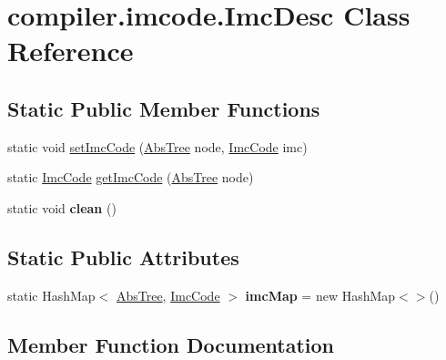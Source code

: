 \hypertarget{classcompiler_1_1imcode_1_1_imc_desc}{}\section{compiler.\+imcode.\+Imc\+Desc Class Reference}
\label{classcompiler_1_1imcode_1_1_imc_desc}
\subsection*{Static Public Member Functions}
\begin{DoxyCompactItemize}
\item 
static void \hyperlink{classcompiler_1_1imcode_1_1_imc_desc_a473fce2cdedd413a152653740dc4efc9}{set\+Imc\+Code} (\hyperlink{classcompiler_1_1abstr_1_1tree_1_1_abs_tree}{Abs\+Tree} node, \hyperlink{interfacecompiler_1_1imcode_1_1_imc_code}{Imc\+Code} imc)
\item 
static \hyperlink{interfacecompiler_1_1imcode_1_1_imc_code}{Imc\+Code} \hyperlink{classcompiler_1_1imcode_1_1_imc_desc_a94ffd7185f2339472d335c475f046a5e}{get\+Imc\+Code} (\hyperlink{classcompiler_1_1abstr_1_1tree_1_1_abs_tree}{Abs\+Tree} node)
\item 
\mbox{\label{classcompiler_1_1imcode_1_1_imc_desc_ac36ed670c3ef02e01402efe21bebcd7b}} 
static void {\bfseries clean} ()
\end{DoxyCompactItemize}
\subsection*{Static Public Attributes}
\begin{DoxyCompactItemize}
\item 
\mbox{\label{classcompiler_1_1imcode_1_1_imc_desc_a1e1f1f2816a9742fd839ce83d46b5de9}} 
static Hash\+Map$<$ \hyperlink{classcompiler_1_1abstr_1_1tree_1_1_abs_tree}{Abs\+Tree}, \hyperlink{interfacecompiler_1_1imcode_1_1_imc_code}{Imc\+Code} $>$ {\bfseries imc\+Map} = new Hash\+Map$<$$>$()
\end{DoxyCompactItemize}


\subsection{Member Function Documentation}
\mbox{\label{classcompiler_1_1imcode_1_1_imc_desc_a94ffd7185f2339472d335c475f046a5e}} 

